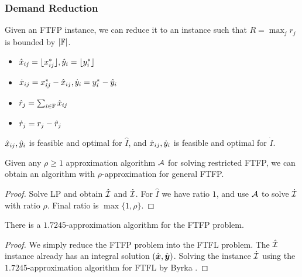 \documentclass[handout, hyperref, xcolor=dvipsnames]{beamer}
\begin{document}
\begin{frame}
  \frametitle{Demand Reduction} Given an FTFP instance, we can reduce
  it to an instance such that $R=\max_{j}r_j$ is bounded by
  $|\mathbb{F}|$.

  \begin{itemize}
    \item ${\hat x}_{ij} = { \lfloor x_{ij}^\ast \rfloor }, {\hat y}_{i} = { \lfloor y_i^\ast \rfloor }$
    \item ${\dot x}_{ij} = x_{ij}^\ast - {\hat x}_{ij}, {\dot y}_{i} = y_i^\ast
      - {\hat y}_{i}$
    \item ${\hat r}_j = \sum_{i\in\mathbb{F}} {\hat x}_{ij}$
    \item ${\dot r}_j = r_j - {\hat r}_j$
  \end{itemize}
  
  \begin{claim}
    ${\hat x}_{ij}, {\hat y}_{i}$ is feasible and optimal for $\hat I$, and
    ${\dot x}_{ij}, {\dot y}_{i}$ is feasible and optimal for $\dot I$.
  \end{claim}
\end{frame}

\begin{frame}
  \begin{theorem}
    Given any $\rho\geq 1$ approximation algorithm ${\cal A}$ for solving
    restricted FTFP, we can obtain an algorithm with
    $\rho$-approximation for general FTFP.
  \end{theorem}
  \begin{proof}
    Solve LP and obtain $\hat {\mathcal{I}}$ and $\dot {\mathcal{I}}$. For $\hat I$ we have
    ratio $1$, and use ${\cal A}$ to solve $\dot {\mathcal{I}}$ with ratio
    $\rho$. Final ratio is $\max\{1,\rho\}$.
  \end{proof}
\end{frame}

\begin{frame}
  \begin{corollary}
    There is a $1.7245$-approximation algorithm for the FTFP problem.
  \end{corollary}
  \begin{proof}
    We simply reduce the FTFP problem into the FTFL problem. The $\hat
    {\mathcal{I}}$ instance already has an integral solution
    $(\hat{\boldsymbol{x}},\hat{\boldsymbol{y}})$.  Solving the instance $\dot {\mathcal{I}}$ using the
    $1.7245$-approximation algorithm for FTFL by Byrka {\etal}.
  \end{proof}
\end{frame}
\end{document}
